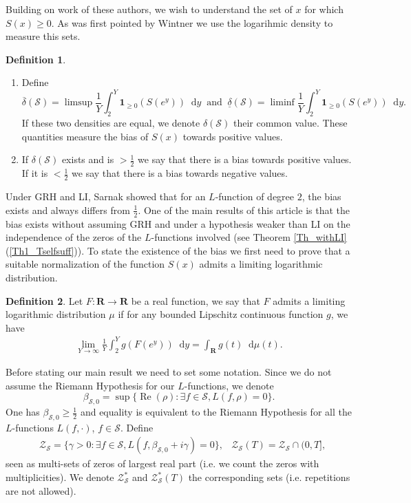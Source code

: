 \documentclass[a4paper,10pt]{amsart}
\theoremstyle{plain}
\theoremstyle{definition}
\newtheorem{defi}{Definition}
\begin{document}
Building on work of these authors, we wish to understand the set of $x$ for which $S(x)\geq0$.
As was first pointed by Wintner \cite{Wintner} we use the logarihmic density to measure this sets.

\begin{defi}\label{Def_logdens}
\begin{enumerate}
\item Define $$\overline{\delta}(\mathcal{S}) = \limsup\frac{1}{Y}\int_{2}^{Y}\mathbf{1}_{\geq 0}(S(e^{y})){\mathop{}\!\mathrm{d}} y \ \text{  and }
\ \underline{\delta}(\mathcal{S}) = \liminf\frac{1}{Y}\int_{2}^{Y}\mathbf{1}_{\geq0}(S(e^{y})){\mathop{}\!\mathrm{d}} y.$$
If these two densities are equal, we denote $\delta(\mathcal{S})$ their common value. These quantities measure the bias of $S(x)$ towards positive values. 
\item If $\delta(\mathcal{S})$ exists and is $> \frac{1}{2}$ 
we say that there is a bias towards positive values. 
If it is $<\frac{1}{2}$ we say that there is a bias towards negative values. 
\end{enumerate}
\end{defi}

Under GRH and LI, 
Sarnak showed that for an $L$-function of degree $2$, 
the bias exists and always differs from $\frac{1}{2}$.
One of the main results of this article is that the bias exists without assuming GRH and under a hypothesis weaker than LI on the independence of the zeros of the $L$-functions involved (see Theorem \ref{Th_withLI}(\ref{Th1_Tselfsuff})).
To state the existence of the bias we first need to prove that 
a suitable normalization of the function $S(x)$ admits a limiting logarithmic distribution.

\begin{defi}
Let $F:\mathbf{R}\rightarrow\mathbf{R}$ be a real function, 
we say that $F$ admits a limiting logarithmic distribution $\mu$ if
for any bounded Lipschitz continuous function $g$, we have
\begin{align*}
\lim_{Y\rightarrow\infty}\frac{1}{Y}\int_{2}^{Y}g(F(e^{y})){\mathop{}\!\mathrm{d}} y = 
\int_{\mathbf{R}}g(t){\mathop{}\!\mathrm{d}}\mu(t).
\end{align*}
\end{defi}

Before stating our main result we need to set some notation.
Since we do not assume the Riemann Hypothesis for our $L$-functions,
we denote
$$\beta_{\mathcal{S},0} =\sup\lbrace \operatorname{Re}(\rho) : \exists f\in\mathcal{S},  L(f,\rho)=0\rbrace.$$ 
One has $\beta_{\mathcal{S},0}\geq \frac{1}{2}$ and equality is equivalent to the Riemann Hypothesis
for all the $L$-functions $L(f,\cdot)$, $f\in\mathcal{S}$.
Define
\begin{align*}
&\mathcal{Z}_{\mathcal{S}} = \lbrace \gamma>0 : \exists f \in \mathcal{S}, L(f,\beta_{\mathcal{S},0} + i\gamma)=0\rbrace,
&\mathcal{Z}_{\mathcal{S}}(T) = \mathcal{Z}_{\mathcal{S}}\cap(0,T],
\end{align*}
seen as multi-sets of zeros of largest real part (i.e. we count the zeros with multiplicities).
We denote $\mathcal{Z}_{\mathcal{S}}^{*}$ and $\mathcal{Z}_{\mathcal{S}}^{*}(T)$ the corresponding sets (i.e. repetitions are not allowed).
\end{document}
